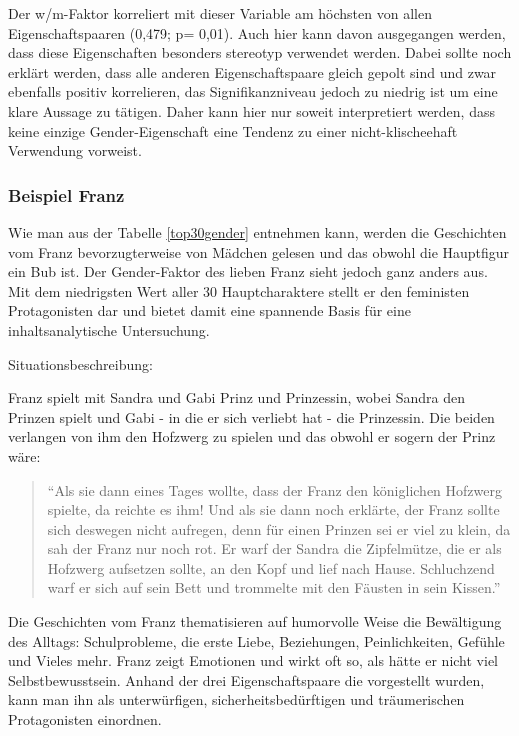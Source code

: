 Der w/m-Faktor korreliert mit dieser Variable am höchsten von allen
Eigenschaftspaaren (0,479; p= 0,01). Auch hier kann davon ausgegangen
werden, dass diese Eigenschaften besonders stereotyp verwendet werden.
Dabei sollte noch erklärt werden, dass alle anderen Eigenschaftspaare
gleich gepolt sind und zwar ebenfalls positiv korrelieren, das
Signifikanzniveau jedoch zu niedrig ist um eine klare Aussage zu
tätigen. Daher kann hier nur soweit interpretiert werden, dass keine
einzige Gender-Eigenschaft eine Tendenz zu einer nicht-klischeehaft
Verwendung vorweist.

\subsubsection{Beispiel Franz}

Wie man aus der Tabelle \ref{top30gender} entnehmen kann, werden die
Geschichten vom Franz bevorzugterweise von Mädchen gelesen und das
obwohl die Hauptfigur ein Bub ist. Der Gender-Faktor des lieben Franz
sieht jedoch ganz anders aus. Mit dem niedrigsten Wert aller 30
Hauptcharaktere stellt er den feministen Protagonisten dar und bietet
damit eine spannende Basis für eine inhaltsanalytische Untersuchung.

Situationsbeschreibung:

Franz spielt mit Sandra und Gabi Prinz und Prinzessin, wobei Sandra den
Prinzen spielt und Gabi - in die er sich verliebt hat - die Prinzessin.
Die beiden verlangen von ihm den Hofzwerg zu spielen und das obwohl er
sogern der Prinz wäre:

\begin{quote}
``Als sie dann eines Tages wollte, dass der Franz den königlichen
Hofzwerg spielte, da reichte es ihm! Und als sie dann noch erklärte, der
Franz sollte sich deswegen nicht aufregen, denn für einen Prinzen sei er
viel zu klein, da sah der Franz nur noch rot. Er warf der Sandra die
Zipfelmütze, die er als Hofzwerg aufsetzen sollte, an den Kopf und lief
nach Hause. Schluchzend warf er sich auf sein Bett und trommelte mit den
Fäusten in sein Kissen.'' \parencite[][30]{Noestlinger2010}
\end{quote}

Die Geschichten vom Franz thematisieren auf humorvolle Weise die
Bewältigung des Alltags: Schulprobleme, die erste Liebe, Beziehungen,
Peinlichkeiten, Gefühle und Vieles mehr. Franz zeigt Emotionen und wirkt
oft so, als hätte er nicht viel Selbstbewusstsein. Anhand der drei
Eigenschaftspaare die vorgestellt wurden, kann man ihn als
unterwürfigen, sicherheitsbedürftigen und träumerischen Protagonisten
einordnen.

